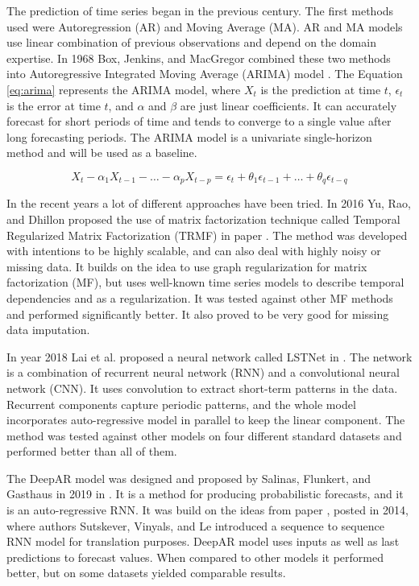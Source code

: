\documentclass[conference]{IEEEtran}
\begin{document}
The prediction of time series began in the previous century.
The first methods used were Autoregression (AR) and Moving Average (MA).
AR and MA models use linear combination of previous observations and depend on the domain expertise.
In 1968 Box, Jenkins, and MacGregor combined these two methods into Autoregressive Integrated Moving Average (ARIMA) model \cite{box1968arima}.
The Equation \ref{eq:arima} represents the ARIMA model, where $X_{t}$ is the prediction at time $t$, $\epsilon_{t}$ is the error at time $t$, and $\alpha$ and $\beta$ are just linear coefficients.
It can accurately forecast for short periods of time and tends to converge to a single value after long forecasting periods.
The ARIMA model is a univariate single-horizon method and will be used as a baseline.

\begin{equation}
    \label{eq:arima}
    X_{t} - \alpha _{1}X_{t-1} - \dots - \alpha _{p}X_{t-p} = \epsilon_{t} + \theta_{1}\epsilon_{t-1} + \dots + \theta_{q}\epsilon_{t-q}
\end{equation}

In the recent years a lot of different approaches have been tried.
In 2016 Yu, Rao, and Dhillon proposed the use of matrix factorization technique called Temporal Regularized Matrix Factorization (TRMF) in paper \cite{yu2016trmf}.
The method was developed with intentions to be highly scalable, and can also deal with highly noisy or missing data.
It builds on the idea to use graph regularization for matrix factorization (MF), but uses well-known time series models to describe temporal dependencies and as a regularization.
It was tested against other MF methods and performed significantly better.
It also proved to be very good for missing data imputation.

In year 2018 Lai et al. proposed a neural network called LSTNet in \cite{lai2018lstnet}.
The network is a combination of recurrent neural network (RNN) and a convolutional neural network (CNN).
It uses convolution to extract short-term patterns in the data.
Recurrent components capture periodic patterns, and the whole model incorporates auto-regressive model in parallel to keep the linear component.
The method was tested against other models on four different standard datasets and performed better than all of them.

The DeepAR model was designed and proposed by Salinas, Flunkert, and Gasthaus in 2019 in \cite{salinas2019deepar}.
It is a method for producing probabilistic forecasts, and it is an auto-regressive RNN.
It was build on the ideas from paper \cite{sutskever2014sequence}, posted in 2014, where authors Sutskever, Vinyals, and Le introduced a sequence to sequence RNN model for translation purposes.
DeepAR model uses inputs as well as last predictions to forecast values.
When compared to other models it performed better, but on some datasets yielded comparable results.
\end{document}
